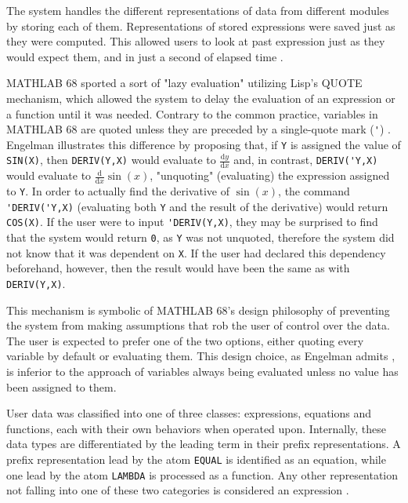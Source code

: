 The system handles the different representations of data from different modules by storing each of them. Representations of stored expressions were saved just as they were computed. This allowed users to look at past expression just as they would expect them, and in just a second of elapsed time \parencite{engelman1971legacy}.

MATHLAB 68 sported a sort of "lazy evaluation" utilizing Lisp's QUOTE mechanism, which allowed the system to delay the evaluation of an expression or a function until it was needed. Contrary to the common practice, variables in MATHLAB 68 are quoted unless they are preceded by a single-quote mark (\verb|'|) \parencite{engelman1971legacy}. Engelman illustrates this difference by proposing that, if \verb|Y| is assigned the value of \verb|SIN(X)|, then \verb|DERIV(Y,X)| would evaluate to $\frac{\mathrm{d}y}{\mathrm{d}x}$ and, in contrast, \verb|DERIV('Y,X)| would evaluate to $\frac{\mathrm{d}}{\mathrm{d}x} \sin(x)$, "unquoting" (evaluating) the expression assigned to \verb|Y|. In order to actually find the derivative of $\sin(x)$, the command \verb|'DERIV('Y,X)| (evaluating both \verb|Y| and the result of the derivative) would return \verb|COS(X)|. If the user were to input \verb|'DERIV(Y,X)|, they may be surprised to find that the system would return \verb|0|, as \verb|Y| was not unquoted, therefore the system did not know that it was dependent on \verb|X|. If the user had declared this dependency beforehand, however, then the result would have been the same as with \verb|DERIV(Y,X)|.

This mechanism is symbolic of MATHLAB 68's design philosophy of preventing the system from making assumptions that rob the user of control over the data. The user is expected to prefer one of the two options, either quoting every variable by default or evaluating them. This design choice, as Engelman admits \parencite{engelman1971legacy}, is inferior to the approach of variables always being evaluated unless no value has been assigned to them.

User data was classified into one of three classes: expressions, equations and functions, each with their own behaviors when operated upon. Internally, these data types are differentiated by the leading term in their prefix representations. A prefix representation lead by the atom \verb|EQUAL| is identified as an equation, while one lead by the atom \verb|LAMBDA| is processed as a function. Any other representation not falling into one of these two categories is considered an expression \parencite{engelman1971legacy}.

